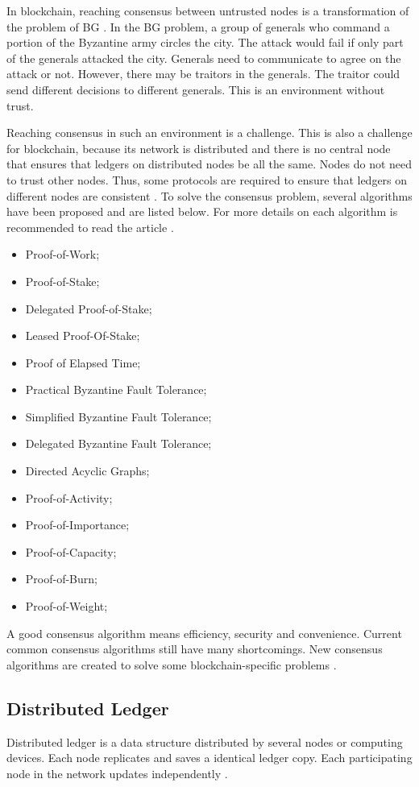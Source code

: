 In blockchain, reaching consensus between untrusted nodes is a transformation of the problem of \ac{BG} \cite{lamport1982byzantine}. In the BG problem, a group of generals who command a portion of the Byzantine army circles the city. The attack would fail if only part of the generals attacked the city. Generals need to communicate to agree on the attack or not. However, there may be traitors in the generals. The traitor could send different decisions to different generals. This is an environment without trust.

Reaching consensus in such an environment is a challenge. This is also a challenge for blockchain, because its network is distributed and there is no central node that ensures that ledgers on distributed nodes be all the same. Nodes do not need to trust other nodes. Thus, some protocols are required to ensure that ledgers on different nodes are consistent \cite{kostarev2017review}. To solve the consensus problem, several algorithms have been proposed and are listed below. For more details on each algorithm is recommended to read the article \cite{mingxiao2017review}.

\begin{itemize}
\item Proof-of-Work;
\item Proof-of-Stake;
\item Delegated Proof-of-Stake;
\item Leased Proof-Of-Stake;
\item Proof of Elapsed Time;
\item Practical Byzantine Fault Tolerance;
\item Simplified Byzantine Fault Tolerance;
\item Delegated Byzantine Fault Tolerance;
\item Directed Acyclic Graphs;
\item Proof-of-Activity;
\item Proof-of-Importance;
\item Proof-of-Capacity;
\item Proof-of-Burn;
\item Proof-of-Weight;
\end{itemize}

A good consensus algorithm means efficiency, security and convenience. Current common consensus algorithms still have many shortcomings. New consensus algorithms are created to solve some blockchain-specific problems \cite{zheng2016blockchain}.

\subsection{Distributed Ledger}\label{sec:livro}
Distributed ledger is a data structure distributed by several nodes or computing devices. Each node replicates and saves a identical ledger copy. Each participating node in the network updates independently \cite{greve2018blockchain}.

